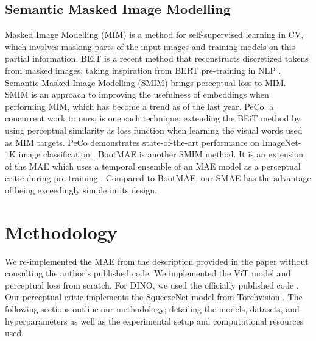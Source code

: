 \subsection{Semantic Masked Image Modelling}
\label{sec:smim}
Masked Image Modelling (MIM) is a method for self-supervised learning in CV, which involves masking parts of the input images and training models on this partial information. BEiT \cite{beit} is a recent method that reconstructs discretized tokens from masked images; taking inspiration from BERT pre-training in NLP \cite{bert}. Semantic Masked Image Modelling (SMIM) brings perceptual loss to MIM. SMIM is an approach to improving the usefulness of embeddings when performing MIM, which has become a trend as of the last year. PeCo, a concurrent work to ours, is one such technique; extending the BEiT method by using perceptual similarity as loss function when learning the visual words used as MIM targets. PeCo demonstrates state-of-the-art performance on ImageNet-1K image classification \cite{peco}. BootMAE is another SMIM method. It is an extension of the MAE which uses a temporal ensemble of an MAE model as a perceptual critic during pre-training \cite{bootmae}. Compared to BootMAE, our SMAE has the advantage of being exceedingly simple in its design.

\section{Methodology}
We re-implemented the MAE from the description provided in the paper without consulting the author's published code. We implemented the ViT model and perceptual loss from scratch. For DINO, we used the officially published code \cite{dino}. Our perceptual critic implements the SqueezeNet model from Torchvision \cite{torchvision}. The following sections outline our methodology; detailing the models, datasets, and hyperparameters as well as the experimental setup and computational resources used.  

